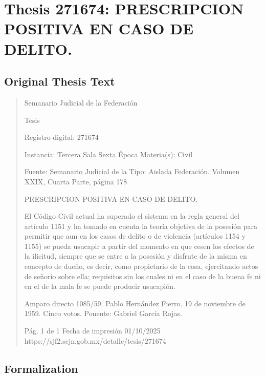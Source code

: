\documentclass[11pt,a4paper]{article}
\begin{document}
\newpage

\section{Thesis 271674: PRESCRIPCION POSITIVA EN CASO DE DELITO.}
\label{thesis:271674}

\subsection{Original Thesis Text}

\begin{quote}
                                                   Semanario Judicial de la Federación

                                                  Tesis

 Registro digital: 271674

 Instancia: Tercera Sala          Sexta Época                          Materia(s): Civil

                                  Fuente: Semanario Judicial de la   Tipo: Aislada
                                  Federación.
                                  Volumen XXIX, Cuarta Parte, página
                                  178


PRESCRIPCION POSITIVA EN CASO DE DELITO.


El Código Civil actual ha superado el sistema en la regla general del artículo 1151 y ha tomado en
cuenta la teoría objetiva de la posesión para permitir que aun en los casos de delito o de violencia
(artículos 1154 y 1155) se pueda usucapir a partir del momento en que cesen los efectos de la
ilicitud, siempre que se entre a la posesión y disfrute de la misma en concepto de dueño, es decir,
como propietario de la cosa, ejercitando actos de señorío sobre ella; requisitos sin los cuales ni en
el caso de la buena fe ni en el de la mala fe se puede producir usucapión.


Amparo directo 1085/59. Pablo Hernández Fierro. 19 de noviembre de 1959. Cinco votos. Ponente:
Gabriel García Rojas.




                                             Pág. 1 de 1            Fecha de impresión 01/10/2025
  https://sjf2.scjn.gob.mx/detalle/tesis/271674

\end{quote}

\subsection{Formalization}
\end{document}
